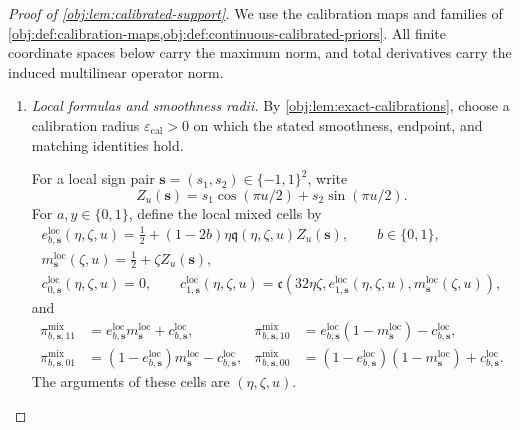 \documentclass[11pt]{article}
\begin{document}
\begin{proof}[Proof of \cref{obj:lem:calibrated-support}]
We use the calibration maps and families of
\cref{obj:def:calibration-maps,obj:def:continuous-calibrated-priors}.
All finite coordinate spaces below carry the maximum norm, and total derivatives carry the induced multilinear operator norm.

\begin{enumerate}
\item \textit{Local formulas and smoothness radii.}
By \cref{obj:lem:exact-calibrations}, choose a calibration radius
\(\varepsilon_{\mathrm{cal}}>0\) on which the stated smoothness, endpoint, and matching identities hold.

For a local sign pair \(\mathbf s=(s_1,s_2)\in\{-1,1\}^2\), write
\[
Z_u(\mathbf s)
=s_1\cos(\pi u/2)+s_2\sin(\pi u/2).
\]
For \(a,y\in\{0,1\}\), define the local mixed cells by
\[
\begin{gathered}
e^{\mathrm{loc}}_{b,\mathbf s}(\eta,\zeta,u)
=\frac12+(1-2b)\eta\mathfrak q(\eta,\zeta,u)Z_u(\mathbf s),
\qquad b\in\{0,1\},\\
m^{\mathrm{loc}}_{\mathbf s}(\zeta,u)
=\frac12+\zeta Z_u(\mathbf s),\\
c^{\mathrm{loc}}_{0,\mathbf s}(\eta,\zeta,u)=0,\qquad
c^{\mathrm{loc}}_{1,\mathbf s}(\eta,\zeta,u)
=\mathfrak c\!\left(
32\eta\zeta,e^{\mathrm{loc}}_{1,\mathbf s}(\eta,\zeta,u),
m^{\mathrm{loc}}_{\mathbf s}(\zeta,u)\right),
\end{gathered}
\]
and
\[
\begin{aligned}
\pi^{\mathrm{mix}}_{b,\mathbf s,11}
&=e^{\mathrm{loc}}_{b,\mathbf s}m^{\mathrm{loc}}_{\mathbf s}
  +c^{\mathrm{loc}}_{b,\mathbf s},&
\pi^{\mathrm{mix}}_{b,\mathbf s,10}
&=e^{\mathrm{loc}}_{b,\mathbf s}(1-m^{\mathrm{loc}}_{\mathbf s})
  -c^{\mathrm{loc}}_{b,\mathbf s},\\
\pi^{\mathrm{mix}}_{b,\mathbf s,01}
&=(1-e^{\mathrm{loc}}_{b,\mathbf s})m^{\mathrm{loc}}_{\mathbf s}
  -c^{\mathrm{loc}}_{b,\mathbf s},&
\pi^{\mathrm{mix}}_{b,\mathbf s,00}
&=(1-e^{\mathrm{loc}}_{b,\mathbf s})(1-m^{\mathrm{loc}}_{\mathbf s})
  +c^{\mathrm{loc}}_{b,\mathbf s}.
\end{aligned}
\]
The arguments of these cells are \((\eta,\zeta,u)\).


\end{enumerate}
\end{proof}
\end{document}
